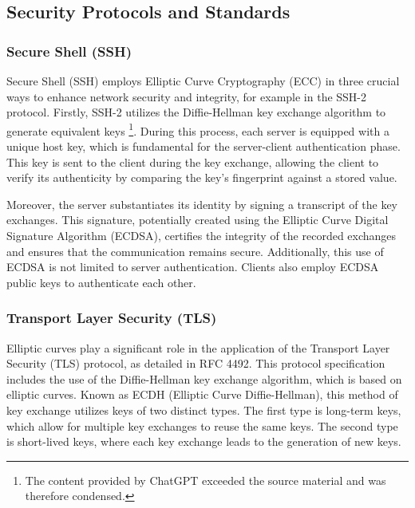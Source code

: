 
\subsection{Security Protocols and Standards}
\label{use-cases:security-protocols-and-standards}

\subsubsection{Secure Shell (SSH)}

Secure Shell (SSH) employs Elliptic Curve Cryptography (ECC) in three crucial ways to enhance network security and integrity, for example in the SSH-2 protocol. Firstly, SSH-2 utilizes the Diffie-Hellman key exchange algorithm to generate equivalent keys \footnote{\label{source-exceeded}The content provided by ChatGPT exceeded the source material and was therefore condensed.}. During this process, each server is equipped with a unique host key, which is fundamental for the server-client authentication phase. This key is sent to the client during the key exchange, allowing the client to verify its authenticity by comparing the key's fingerprint against a stored value.

Moreover, the server substantiates its identity by signing a transcript of the key exchanges. This signature, potentially created using the Elliptic Curve Digital Signature Algorithm (ECDSA), certifies the integrity of the recorded exchanges and ensures that the communication remains secure. Additionally, this use of ECDSA is not limited to server authentication. Clients also employ ECDSA public keys to authenticate each other. 

\subsubsection{Transport Layer Security (TLS)}

Elliptic curves play a significant role in the application of the Transport Layer Security (TLS) protocol, as detailed in RFC 4492. This protocol specification includes the use of the Diffie-Hellman key exchange algorithm, which is based on elliptic curves. Known as ECDH (Elliptic Curve Diffie-Hellman), this method of key exchange utilizes keys of two distinct types. The first type is long-term keys, which allow for multiple key exchanges to reuse the same keys. The second type is short-lived keys, where each key exchange leads to the generation of new keys.

